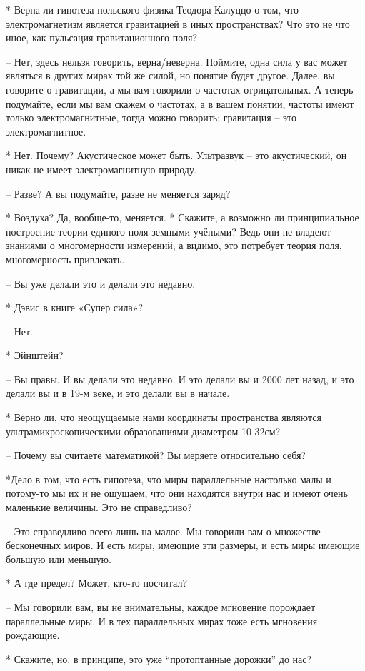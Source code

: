  * Верна ли гипотеза польского физика Теодора Калуццо о том, что электромагнетизм является гравитацией в иных пространствах? Что это не что иное, как пульсация гравитационного поля?

 – Нет, здесь нельзя говорить, верна/неверна. Поймите, одна сила у вас может являться в других мирах той же силой, но понятие будет другое. Далее, вы говорите о гравитации, а мы вам говорили о частотах отрицательных. А теперь подумайте, если мы вам скажем о частотах, а в вашем понятии, частоты имеют только электромагнитные, тогда можно говорить: гравитация – это электромагнитное.

 * Нет. Почему? Акустическое может быть. Ультразвук – это акустический, он никак не имеет электромагнитную природу.

 – Разве? А вы подумайте, разве не меняется заряд?

 * Воздуха? Да, вообще-то, меняется.
 * Скажите, а возможно ли принципиальное построение теории единого поля земными учёными? Ведь они не владеют знаниями о многомерности измерений, а видимо, это потребует теория поля, многомерность привлекать.

 – Вы уже делали это и делали это недавно.

 * Дэвис в книге «Супер сила»?

 – Нет.

 * Эйнштейн?

 – Вы правы. И вы делали это недавно. И это делали вы и 2000 лет назад, и это делали вы и в 19-м веке, и это делали вы в начале.

 * Верно ли, что неощущаемые нами координаты пространства являются ультрамикроскопическими образованиями диаметром 10-32см?

 – Почему вы считаете математикой? Вы меряете относительно себя?

 *Дело в том, что есть гипотеза, что миры параллельные настолько малы и потому-то мы их и не ощущаем, что они находятся внутри нас и имеют очень маленькие величины. Это не справедливо?

 – Это справедливо всего лишь на малое. Мы говорили вам о множестве бесконечных миров. И есть миры, имеющие эти размеры, и есть миры имеющие большую или меньшую.

 * А где предел? Может, кто-то посчитал?

 – Мы говорили вам, вы не внимательны, каждое мгновение порождает параллельные миры. И в тех параллельных мирах тоже есть мгновения рождающие.

 * Скажите, но, в принципе, это уже “протоптанные дорожки” до нас?

